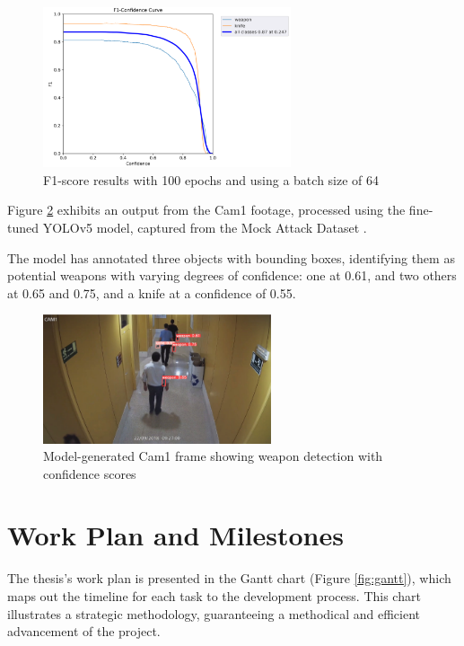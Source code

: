 \begin{figure}[h]
    \centering 
    \includegraphics[width=0.65\textwidth]{figs/f1-score.png} %
        \caption{F1-score results with 100 epochs and using a batch size of 64}
        \label{fig:f1-score}
\end{figure}

Figure \ref{fig:cam1-frame} exhibits an output from the Cam1 footage, processed using the fine-tuned YOLOv5 model, captured from the Mock Attack Dataset \cite{rfc45}.

The model has annotated three objects with bounding boxes, identifying them as potential weapons with varying degrees of confidence: one at 0.61, and two others at 0.65 and 0.75, and a knife at a confidence of 0.55. 

\begin{figure}[h]
    \centering 
    \includegraphics[width=0.6\textwidth]{figs/cam1-frame.png} %
        \caption{Model-generated Cam1 frame showing weapon detection with confidence scores}
        \label{fig:cam1-frame}
\end{figure}

\section{Work Plan and Milestones}
The thesis's work plan is presented in the Gantt chart (Figure \ref{fig:gantt}), which maps out the timeline for each task to the development process. This chart illustrates a strategic methodology, guaranteeing a methodical and efficient advancement of the project. 

